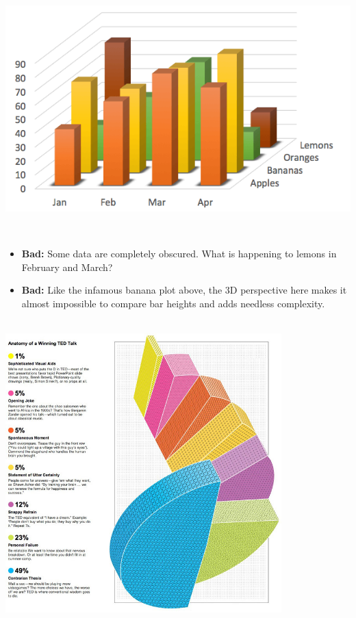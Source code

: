 \documentclass[]{book}
\providecommand{\tightlist}{%
  \setlength{\itemsep}{0pt}\setlength{\parskip}{0pt}}
\begin{document}
~\\

\includegraphics{img/vis13.png}

~

\begin{itemize}
\tightlist
\item
  \textbf{Bad:} Some data are completely obscured. What is happening to lemons in February and March?\\
\item
  \textbf{Bad:} Like the infamous banana plot above, the 3D perspective here makes it almost impossible to compare bar heights and adds needless complexity.
\end{itemize}

~\\

\includegraphics[width=0.8\textwidth,height=\textheight]{img/vis15.jpg}
\end{document}
